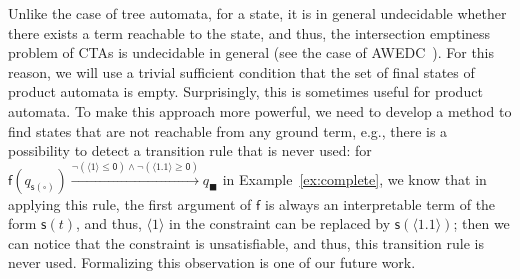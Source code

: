 \documentclass[copyright,creativecommons]{eptcs}
\newcommand{\posvar}[1]{{\langle}#1{\rangle}}
\begin{document}
Unlike the case of tree automata, for a state, it is in general
undecidable whether there exists a term reachable to the state, and
thus, the intersection emptiness problem of CTAs is
undecidable in general (see the case of
AWEDC~\cite[Theorem~4.2.10]{TATA}).
For this reason, we will use a trivial sufficient condition that the set
of final states of product automata is empty. 
Surprisingly, this is sometimes useful for product automata. 
To make this approach more powerful, we need to develop a method to
find states that are not reachable from any ground term, e.g., there is
a possibility to detect a transition rule that is never used:
for $\mathsf{f}(q_{\mathsf{s}(\square)}) \xrightarrow[]{\neg (\posvar{1}
\leq \mathsf{0}) \wedge \neg (\posvar{1.1} \geq \mathsf{0})} q_{\blacksquare}$ in
	 Example~\ref{ex:complete},
we know that in applying this rule, the first argument of $\mathsf{f}$
is always an interpretable term of the form $\mathsf{s}(t)$, and thus,
$\posvar{1}$ in the constraint can be replaced by
$\mathsf{s}(\posvar{1.1})$;
then we can notice that the constraint is unsatisfiable, and thus, this
transition rule is never used. 
Formalizing this observation is one of our future work. 
\end{document}

